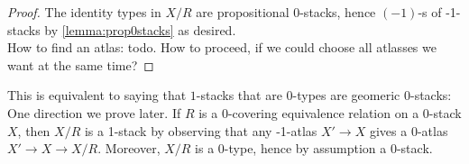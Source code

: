 \begin{proof}
	The identity types in $X / R$ are propositional  0-stacks, hence $(-1)$-\truncation s of  -1-stacks by \ref{lemma:prop0stacks} as desired. \\
	How to find an atlas: todo. How to proceed, if we could choose all atlasses we want at the same time?
	
	
\end{proof}
\begin{rmk}
	This is equivalent to saying that  $1$-stacks that are $0$-types are geomeric $0$-stacks: One direction we prove later. If $R$ is a 0-covering equivalence relation on a  0-stack $X$, then $ X/ R$ is a  1-stack by observing that any -1-atlas $X' \to X$ gives a 0-atlas $X' \to X \to X/ R$. Moreover, $ X/ R$ is a 0-type, hence by assumption a  0-stack.
\end{rmk}

